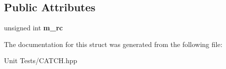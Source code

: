 \subsection*{Public Attributes}
\begin{DoxyCompactItemize}
\item 
unsigned int {\bfseries m\+\_\+rc}\hypertarget{structCatch_1_1SharedImpl_a7e71ef1985b85aa41a1632f932a96bcb}{}\label{structCatch_1_1SharedImpl_a7e71ef1985b85aa41a1632f932a96bcb}

\end{DoxyCompactItemize}


The documentation for this struct was generated from the following file\+:\begin{DoxyCompactItemize}
\item 
Unit Tests/C\+A\+T\+C\+H.\+hpp\end{DoxyCompactItemize}
